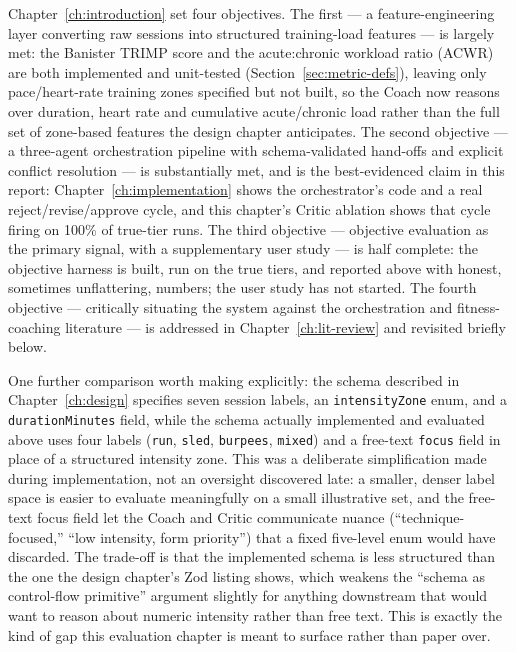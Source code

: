 Chapter~\ref{ch:introduction} set four objectives. The first --- a feature-engineering layer converting raw sessions into structured training-load features --- is largely met: the Banister TRIMP score and the acute:chronic workload ratio (ACWR) are both implemented and unit-tested (Section~\ref{sec:metric-defs}), leaving only pace/heart-rate training zones specified but not built, so the Coach now reasons over duration, heart rate and cumulative acute/chronic load rather than the full set of zone-based features the design chapter anticipates. The second objective --- a three-agent orchestration pipeline with schema-validated hand-offs and explicit conflict resolution --- is substantially met, and is the best-evidenced claim in this report: Chapter~\ref{ch:implementation} shows the orchestrator's code and a real reject/revise/approve cycle, and this chapter's Critic ablation shows that cycle firing on 100\% of true-tier runs. The third objective --- objective evaluation as the primary signal, with a supplementary user study --- is half complete: the objective harness is built, run on the true tiers, and reported above with honest, sometimes unflattering, numbers; the user study has not started. The fourth objective --- critically situating the system against the orchestration and fitness-coaching literature --- is addressed in Chapter~\ref{ch:lit-review} and revisited briefly below.

One further comparison worth making explicitly: the schema described in Chapter~\ref{ch:design} specifies seven session labels, an \texttt{intensityZone} enum, and a \texttt{durationMinutes} field, while the schema actually implemented and evaluated above uses four labels (\texttt{run}, \texttt{sled}, \texttt{burpees}, \texttt{mixed}) and a free-text \texttt{focus} field in place of a structured intensity zone. This was a deliberate simplification made during implementation, not an oversight discovered late: a smaller, denser label space is easier to evaluate meaningfully on a small illustrative set, and the free-text focus field let the Coach and Critic communicate nuance (``technique-focused,'' ``low intensity, form priority'') that a fixed five-level enum would have discarded. The trade-off is that the implemented schema is less structured than the one the design chapter's Zod listing shows, which weakens the ``schema as control-flow primitive'' argument slightly for anything downstream that would want to reason about numeric intensity rather than free text. This is exactly the kind of gap this evaluation chapter is meant to surface rather than paper over.

